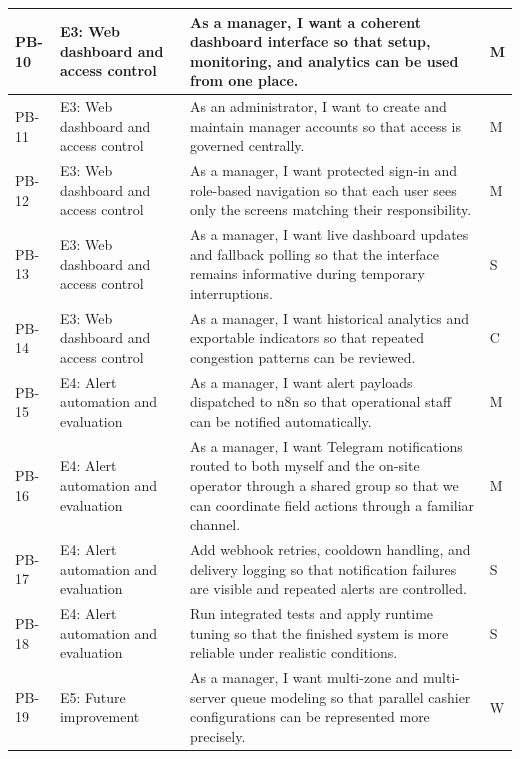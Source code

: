 \begin{longtable}{|l|p{}|p{}|l|}
    PB-10 & E3: Web dashboard and access control & As a manager, I want a coherent dashboard interface so that setup, monitoring, and analytics can be used from one place. & M \\ \hline
    PB-11 & E3: Web dashboard and access control & As an administrator, I want to create and maintain manager accounts so that access is governed centrally. & M \\ \hline
    PB-12 & E3: Web dashboard and access control & As a manager, I want protected sign-in and role-based navigation so that each user sees only the screens matching their responsibility. & M \\ \hline
    PB-13 & E3: Web dashboard and access control & As a manager, I want live dashboard updates and fallback polling so that the interface remains informative during temporary interruptions. & S \\ \hline
    PB-14 & E3: Web dashboard and access control & As a manager, I want historical analytics and exportable indicators so that repeated congestion patterns can be reviewed. & C \\ \hline
    PB-15 & E4: Alert automation and evaluation & As a manager, I want alert payloads dispatched to n8n so that operational staff can be notified automatically. & M \\ \hline
    PB-16 & E4: Alert automation and evaluation & As a manager, I want Telegram notifications routed to both myself and the on-site operator through a shared group so that we can coordinate field actions through a familiar channel. & M \\ \hline
    PB-17 & E4: Alert automation and evaluation & Add webhook retries, cooldown handling, and delivery logging so that notification failures are visible and repeated alerts are controlled. & S \\ \hline
    PB-18 & E4: Alert automation and evaluation & Run integrated tests and apply runtime tuning so that the finished system is more reliable under realistic conditions. & S \\ \hline
    PB-19 & E5: Future improvement & As a manager, I want multi-zone and multi-server queue modeling so that parallel cashier configurations can be represented more precisely. & W \\ \hline
\end{longtable}
\endgroup

